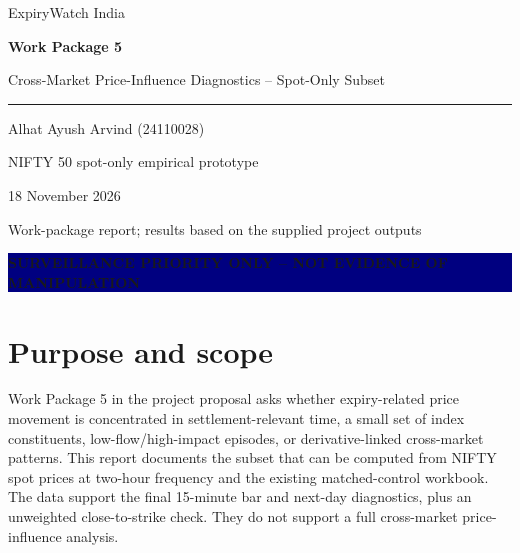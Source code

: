 \documentclass[11pt,a4paper]{article}
\newcommand{\banner}{\begin{center}\colorbox{navy}{\parbox{0.94\linewidth}{\centering\color{white}\textbf{SURVEILLANCE PRIORITY ONLY -- NOT EVIDENCE OF MANIPULATION}}}\end{center}}
\begin{document}
\begin{titlepage}\centering\vspace*{22mm}
{\Large ExpiryWatch India\par}\vspace{18mm}
{\color{navy}\Huge\bfseries Work Package 5\par}\vspace{8mm}
{\Large Cross-Market Price-Influence Diagnostics -- Spot-Only Subset\par}\vspace{18mm}
\rule{0.72\linewidth}{0.7pt}\par\vspace{12mm}
{\large Alhat Ayush Arvind (24110028)\par}\vspace{4mm}
{\large NIFTY 50 spot-only empirical prototype\par}\vfill
{\large 18 November 2026\par}\vspace{5mm}
{\small Work-package report; results based on the supplied project outputs}\par
\end{titlepage}
\banner
\begin{abstract}
This report evaluates the WP5 diagnostics that can be estimated from two-hour NIFTY spot data and matched controls. Across 367 S1 expiries, elevated final-bar activity is concentrated in monthly expiries and the 2023--2026 era, while strike proximity, next-day reversal and serial recurrence provide limited or non-robust evidence. Constituent concentration, price impact and cross-market asymmetry remain unmeasured because the required constituent, flow, options and futures data are absent. The findings describe market behaviour and surveillance priority only.
\end{abstract}
\tableofcontents\clearpage
\section{Purpose and scope}
Work Package 5 in the project proposal asks whether expiry-related price movement is concentrated in settlement-relevant time, a small set of index constituents, low-flow/high-impact episodes, or derivative-linked cross-market patterns. This report documents the subset that can be computed from NIFTY spot prices at two-hour frequency and the existing matched-control workbook. The data support the final 15-minute bar and next-day diagnostics, plus an unweighted close-to-strike check. They do not support a full cross-market price-influence analysis.
\end{document}
